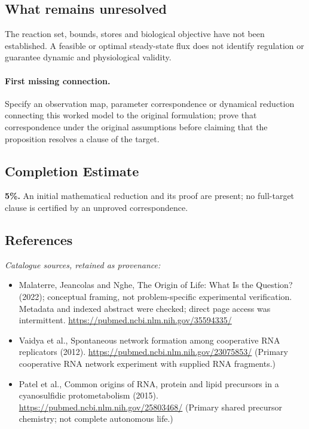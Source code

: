 \documentclass[11pt]{article}
\begin{document}
\subsection{What remains unresolved}
The reaction set, bounds, stores and biological objective have not been established. A feasible or optimal steady-state flux does not identify regulation or guarantee dynamic and physiological validity.
\paragraph{First missing connection.} Specify an observation map, parameter correspondence or dynamical reduction connecting this worked model to the original formulation; prove that correspondence under the original assumptions before claiming that the proposition resolves a clause of the target.
\subsection{Completion Estimate}
\textbf{5\%.} An initial mathematical reduction and its proof are present; no full-target clause is certified by an unproved correspondence.
\subsection{References}
\noindent\emph{Catalogue sources, retained as provenance:}
\begin{itemize}
\item Malaterre, Jeancolas and Nghe, The Origin of Life: What Is the Question? (2022); conceptual framing, not problem-specific experimental verification. Metadata and indexed abstract were checked; direct page access was intermittent. \url{https://pubmed.ncbi.nlm.nih.gov/35594335/}
\item Vaidya et al., Spontaneous network formation among cooperative RNA replicators (2012). \url{https://pubmed.ncbi.nlm.nih.gov/23075853/} (Primary cooperative RNA network experiment with supplied RNA fragments.)
\item Patel et al., Common origins of RNA, protein and lipid precursors in a cyanosulfidic protometabolism (2015). \url{https://pubmed.ncbi.nlm.nih.gov/25803468/} (Primary shared precursor chemistry; not complete autonomous life.)
\end{itemize}
\clearpage


\appendix
\end{document}
